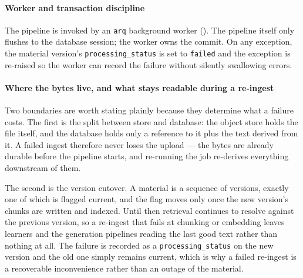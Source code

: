 \paragraph{Worker and transaction discipline}
The pipeline is invoked by an \texttt{arq} background worker (). The pipeline itself only flushes to the database session; the worker owns the commit. On any exception, the material version's \texttt{processing\_status} is set to \texttt{failed} and the exception is re-raised so the worker can record the failure without silently swallowing errors.

\paragraph{Where the bytes live, and what stays readable during a re-ingest}
Two boundaries are worth stating plainly because they determine what a failure costs. The first is the split between store and database: the object store holds the file itself, and the database holds only a reference to it plus the text derived from it. A failed ingest therefore never loses the upload --- the bytes are already durable before the pipeline starts, and re-running the job re-derives everything downstream of them.

The second is the version cutover. A material is a sequence of versions, exactly one of which is flagged current, and the flag moves only once the new version's chunks are written and indexed. Until then retrieval continues to resolve against the previous version, so a re-ingest that fails at chunking or embedding leaves learners and the generation pipelines reading the last good text rather than nothing at all. The failure is recorded as a \texttt{processing\_status} on the new version and the old one simply remains current, which is why a failed re-ingest is a recoverable inconvenience rather than an outage of the material.
